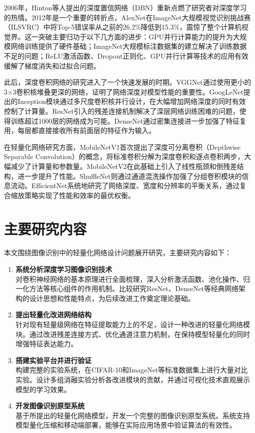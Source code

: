 2006年，Hinton等人提出的深度置信网络（DBN）重新点燃了研究者对深度学习的热情。2012年是一个重要的转折点，AlexNet在ImageNet大规模视觉识别挑战赛（ILSVRC）中将Top-5错误率从之前的26.2\%降低到15.3\%，震惊了整个计算机视觉界。这一突破主要归功于以下几方面的进步：GPU并行计算能力的提升为大规模网络训练提供了硬件基础；ImageNet大规模标注数据集的建立解决了训练数据不足的问题；ReLU激活函数、Dropout正则化、GPU并行计算等技术的应用有效缓解了梯度消失和过拟合问题。

此后，深度卷积网络的研究进入了一个快速发展的时期。VGGNet通过使用更小的3×3卷积核堆叠更深的网络，证明了网络深度对模型性能的重要性。GoogLeNet提出的Inception模块通过多尺度卷积核并行设计，在大幅增加网络深度的同时有效控制了计算量。ResNet引入的残差连接机制解决了深层网络训练困难的问题，使得训练超过1000层的网络成为可能。DenseNet通过密集连接进一步加强了特征复用，每层都直接接收所有前面层的特征作为输入。

在轻量化网络研究方面，MobileNetV1首次提出了深度可分离卷积（Depthwise Separable Convolution）的概念，将标准卷积分解为深度卷积和逐点卷积两步，大幅减少了计算量和参数量。MobileNetV2在此基础上引入了线性瓶颈和倒残差结构，进一步提升了性能。ShuffleNet则通过通道混洗操作加强了分组卷积模块的信息流动。EfficientNet系统地研究了网络深度、宽度和分辨率的平衡关系，通过复合缩放策略实现了性能和效率的最优权衡。

\section{主要研究内容}

本文围绕图像识别中的轻量化网络设计问题展开研究，主要研究内容如下：

\begin{enumerate}
    \item \textbf{系统分析深度学习图像识别技术}\\
        对卷积神经网络的基本原理进行全面梳理，深入分析激活函数、池化操作、归一化方法等核心组件的作用机制。比较研究ResNet、DenseNet等经典网络架构的设计思想和性能特点，为后续改进工作奠定理论基础。

    \item \textbf{提出轻量化改进网络结构}\\
        针对现有轻量级网络在特征提取能力上的不足，设计一种改进的轻量化网络模块。通过改进残差连接方式、优化通道注意力机制，在保持模型轻量化的同时增强特征表达能力。

    \item \textbf{搭建实验平台并进行验证}\\
        构建完整的实验系统，在CIFAR-10和ImageNet等标准数据集上进行大量对比实验。设计多组消融实验分析各改进模块的贡献，并通过可视化技术直观展示模型的学习效果。

    \item \textbf{开发图像识别原型系统}\\
        基于所提出的轻量化网络模型，开发一个完整的图像识别原型系统。系统支持模型量化压缩和移动端部署，能够在实际应用场景中验证算法的有效性。
\end{enumerate}

